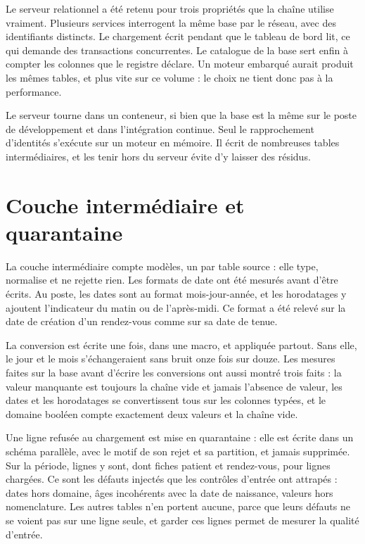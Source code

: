 Le serveur relationnel a été retenu pour trois propriétés que la chaîne utilise vraiment. Plusieurs
services interrogent la même base par le réseau, avec des identifiants distincts. Le chargement
écrit pendant que le tableau de bord lit, ce qui demande des transactions concurrentes. Le catalogue
de la base sert enfin à compter les colonnes que le registre déclare. Un moteur embarqué aurait
produit les mêmes tables, et plus vite sur ce volume : le choix ne tient donc pas à la performance.

Le serveur tourne dans un conteneur, si bien que la base est la même sur le poste de développement
et dans l'intégration continue. Seul le rapprochement d'identités s'exécute sur un moteur en
mémoire. Il écrit de nombreuses tables intermédiaires, et les tenir hors du serveur évite d'y
laisser des résidus.

\section{Couche intermédiaire et quarantaine}\label{sec:quarantaine}

La couche intermédiaire compte  modèles, un par table source : elle
type, normalise et ne rejette rien. Les formats de date ont été mesurés avant d'être écrits. Au
poste, les dates sont au format mois-jour-année, et les horodatages y ajoutent l'indicateur du
matin ou de l'après-midi. Ce format a été relevé sur la date de création d'un
rendez-vous comme sur sa date de tenue.

La conversion est écrite une fois, dans une macro, et appliquée partout. Sans elle, le jour et le
mois s'échangeraient sans bruit onze fois sur douze. Les mesures faites sur la base avant d'écrire
les conversions ont aussi montré trois faits : la valeur manquante est toujours la chaîne vide et
jamais l'absence de valeur, les dates et les horodatages se convertissent tous sur les
 colonnes typées, et le domaine booléen compte exactement deux
valeurs et la chaîne vide.

Une ligne refusée au chargement est mise en quarantaine : elle est écrite dans un schéma parallèle,
avec le motif de son rejet et sa partition, et jamais supprimée. Sur la période,
 lignes y sont, dont  fiches
patient et  rendez-vous, pour
 lignes chargées. Ce sont les défauts injectés que les contrôles
d'entrée ont attrapés : dates hors domaine, âges incohérents avec la date de naissance, valeurs hors
nomenclature. Les autres tables n'en portent aucune, parce que leurs défauts ne se voient pas sur
une ligne seule, et garder ces lignes permet de mesurer la qualité d'entrée.


